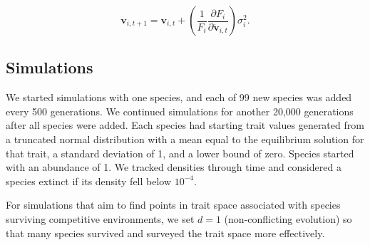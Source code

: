 \begin{equation} \label{eq:trait-change-stochastic}
    \mathbf{v}_{i,t+1} = \mathbf{v}_{i,t} + \left( \frac{1}{F_i}
        \frac{\partial F_i}{\partial \mathbf{\ddot{v}}_{i,t}} \right) \sigma^2_i
    \textrm{.}
\end{equation}





\subsection*{Simulations}

We started simulations with one species, and each of 99 new species
was added every 500 generations.
We continued simulations for another 20,000 generations after all
species were added.
Each species had starting trait values generated from a truncated normal distribution 
with a mean equal to the equilibrium solution for that trait,
a standard deviation of 1, and a lower bound of zero.
Species started with an abundance of 1.
We tracked densities through time and considered a species extinct if its 
density fell below $10^{-4}$.



For simulations that aim to find points in trait space associated with
species surviving competitive environments, we set $d = 1$ 
(non-conflicting evolution) so that many species
survived and surveyed the trait space more effectively.





